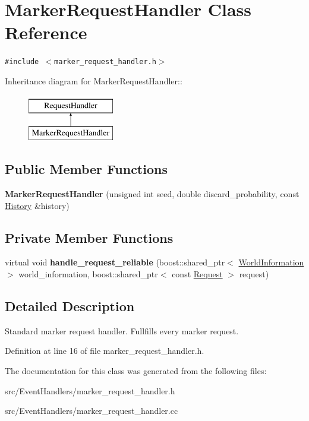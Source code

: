 \hypertarget{class_marker_request_handler}{
\section{MarkerRequestHandler Class Reference}
\label{class_marker_request_handler}
}
{\tt \#include $<$marker\_\-request\_\-handler.h$>$}

Inheritance diagram for MarkerRequestHandler::\begin{figure}[H]
\begin{center}
\leavevmode
\includegraphics[height=2cm]{class_marker_request_handler}
\end{center}
\end{figure}
\subsection*{Public Member Functions}
\begin{CompactItemize}
\item 
\hypertarget{class_marker_request_handler_5e1961178d8824f7f209107e4f4c49c9}{
\textbf{MarkerRequestHandler} (unsigned int seed, double discard\_\-probability, const \hyperlink{class_history}{History} \&history)}
\label{class_marker_request_handler_5e1961178d8824f7f209107e4f4c49c9}

\end{CompactItemize}
\subsection*{Private Member Functions}
\begin{CompactItemize}
\item 
\hypertarget{class_marker_request_handler_653344108cddbff3f2163a64821ba730}{
virtual void \textbf{handle\_\-request\_\-reliable} (boost::shared\_\-ptr$<$ \hyperlink{class_world_information}{WorldInformation} $>$ world\_\-information, boost::shared\_\-ptr$<$ const \hyperlink{class_request}{Request} $>$ request)}
\label{class_marker_request_handler_653344108cddbff3f2163a64821ba730}

\end{CompactItemize}


\subsection{Detailed Description}
Standard marker request handler. Fullfills every marker request. 

Definition at line 16 of file marker\_\-request\_\-handler.h.

The documentation for this class was generated from the following files:\begin{CompactItemize}
\item 
src/EventHandlers/marker\_\-request\_\-handler.h\item 
src/EventHandlers/marker\_\-request\_\-handler.cc\end{CompactItemize}

